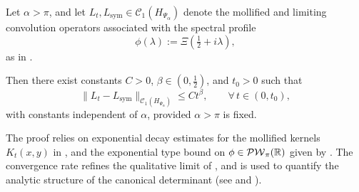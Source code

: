 \begin{lemma}
\label{lem:trace_norm_rate_convergence}
Let \( \alpha > \pi \), and let \( L_t, L_{\mathrm{sym}} \in \mathcal{C}_1(H_{\Psi_\alpha}) \) denote the mollified and limiting convolution operators associated with the spectral profile
\[
\phi(\lambda) := \Xi\left( \tfrac{1}{2} + i\lambda \right),
\]
as in .

Then there exist constants \( C > 0 \), \( \beta \in (0, \tfrac{1}{2}) \), and \( t_0 > 0 \) such that
\[
\| L_t - L_{\mathrm{sym}} \|_{\mathcal{C}_1(H_{\Psi_\alpha})} \le C t^\beta, \qquad \forall\, t \in (0, t_0),
\]
with constants independent of \( \alpha \), provided \( \alpha > \pi \) is fixed.

\medskip
\noindent
The proof relies on exponential decay estimates for the mollified kernels \( K_t(x,y) \) in , and the exponential type bound on \( \phi \in \mathcal{PW}_{\pi}(\mathbb{R}) \) given by . The convergence rate refines the qualitative limit of , and is used to quantify the analytic structure of the canonical determinant (see  and ).
\end{lemma}
